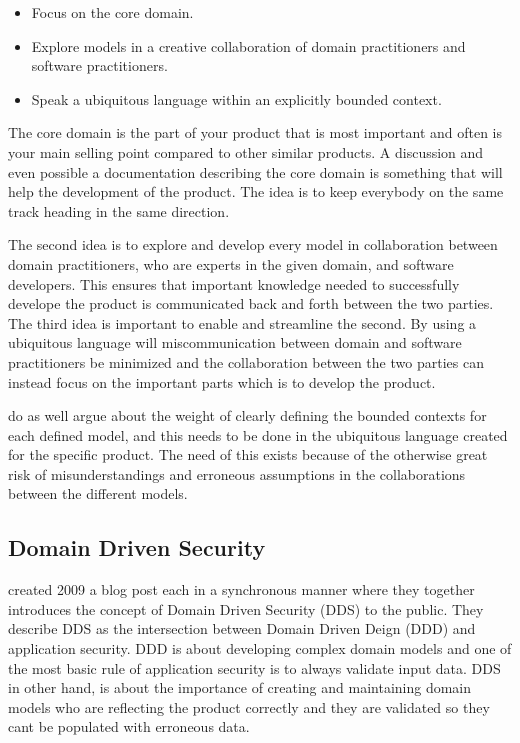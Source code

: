 \begin{itemize}
  \item Focus on the core domain.
  \item Explore models in a creative collaboration of domain practitioners and software practitioners.
  \item Speak a ubiquitous language within an explicitly bounded context.
\end{itemize}

The core domain is the part of your product that is most important and often is your main selling point compared to other similar products. \parencite{millett_2015} A discussion and even possible a documentation describing the core domain is something that will help the development of the product. The idea is to keep everybody on the same track heading in the same direction. \parencite{EvansEric2004Dd:t}

The second idea is to explore and develop every model in collaboration between domain practitioners, who are experts in the given domain, and software developers. This ensures that important knowledge needed to successfully develope the product is communicated back and forth between the two parties. \parencite{millett_2015} The third idea is important to enable and streamline the second. By using a ubiquitous language will miscommunication between domain and software practitioners be minimized and the collaboration between the two parties can instead focus on the important parts which is to develop the product. \parencite{evans_2015}

\textcite{evans_2015} do as well argue about the weight of clearly defining the bounded contexts for each defined model, and this needs to be done in the ubiquitous language created for the specific product. The need of this exists because of the otherwise great risk of misunderstandings and erroneous assumptions in the collaborations between the different models. \parencite{millett_2015}


\subsection{Domain Driven Security}
\textcite{Wilander2009, Johnsson2009} created 2009 a blog post each in a synchronous manner where they together introduces the concept of Domain Driven Security (DDS) to the public. They describe DDS as the intersection between Domain Driven Deign (DDD) and application security. DDD is about developing complex domain models and one of the most basic rule of application security is to always validate input data. DDS in other hand, is about the importance of creating and maintaining domain models who are reflecting the product correctly and they are validated so they cant be populated with erroneous data. \parencite{Wilander2009, Johnsson2009, Arnor2016, Stendahl2016} 